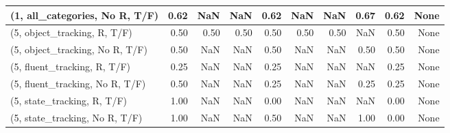 \begin{table*}[h!]
\begin{adjustbox}{width=2\columnwidth,center}
\begin{tabular}{lrrr|rrr|rrr}
(1, all\_categories, No R, T/F)       &                      0.62 &                   NaN &                       NaN &                          0.62 &                       NaN &                           NaN &                                   0.67 &                               0.62 &                                  None \\



\midrule
(5, object\_tracking, R, T/F)         &                      0.50 &                  0.50 &                      0.50 &                          0.50 &                      0.50 &                          0.50 &                                    NaN &                               0.50 &                                  None \\
(5, object\_tracking, No R, T/F)      &                      0.50 &                   NaN &                       NaN &                          0.50 &                       NaN &                           NaN &                                   0.50 &                               0.50 &                                  None \\
(5, fluent\_tracking, R, T/F)         &                      0.25 &                   NaN &                       NaN &                          0.25 &                       NaN &                           NaN &                                    NaN &                               0.25 &                                  None \\
(5, fluent\_tracking, No R, T/F)      &                      0.50 &                   NaN &                       NaN &                          0.25 &                       NaN &                           NaN &                                   0.25 &                               0.25 &                                  None \\
(5, state\_tracking, R, T/F)          &                      1.00 &                   NaN &                       NaN &                          0.00 &                       NaN &                           NaN &                                    NaN &                               0.00 &                                  None \\
(5, state\_tracking, No R, T/F)       &                      1.00 &                   NaN &                       NaN &                          0.50 &                       NaN &                           NaN &                                   1.00 &                               0.00 &                                  None \\

\end{tabular}
\end{adjustbox}
\end{table*}
